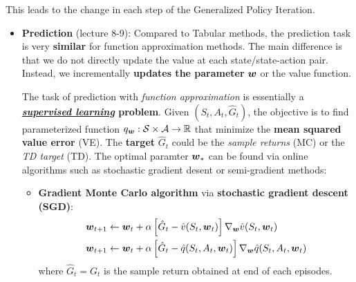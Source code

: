 \documentclass[11pt]{article}
\begin{document}
This leads to the change in each step of the Generalized Policy Iteration.
\begin{itemize}
\item \textbf{Prediction} (lecture 8-9): Compared to Tabular methods, the prediction task is very \textbf{similar} for function approximation methods. The main difference is that we do not directly update the value at each state/state-action pair. Instead, we incrementally \textbf{updates the parameter} $\boldsymbol{w}$ or the value function. 

The task of prediction with \emph{function approximation} is essentially a \textbf{\emph{\underline{supervised learning}} problem}. Given $(S_{t}, A_{t}, \hat{G}_{t})$, the objective is to find parameterized function $q_{\boldsymbol{w}}: {\mathcal S} \times {\mathcal A} \rightarrow {\mathbb R}$ that minimize the \textbf{mean squared value error} (VE). The \textbf{target} $\hat{G}_{t}$ could be the \emph{sample returns} (MC) or the \emph{TD target} (TD). The optimal paramter $\boldsymbol{w}_{*}$ can be found via online algorithms such as stochastic gradient desent or semi-gradient methods:
\begin{itemize}
\item \textbf{Gradient Monte Carlo algorithm} via \textbf{stochastic gradient descent (SGD)}: 
\begin{align}
\boldsymbol{w}_{t+1} &\leftarrow  \boldsymbol{w}_{t} + \alpha \left[\hat{G}_{t} - \hat{v}(S_{t}, \boldsymbol{w}_{t})\right] \nabla_{\boldsymbol{w}}{\hat{v}(S_{t}, \boldsymbol{w}_{t})} \label{eqn: sgd_fun_approx} \\
\boldsymbol{w}_{t+1} &\leftarrow  \boldsymbol{w}_{t} + \alpha \left[\hat{G}_{t} - \hat{q}(S_{t}, A_{t}, \boldsymbol{w}_{t})\right] \nabla_{\boldsymbol{w}}{\hat{q}(S_{t},  A_{t}, \boldsymbol{w}_{t})} \nonumber
\end{align} where $\hat{G}_{t} = G_{t}$ is the sample return obtained at end of each episodes. 


\end{itemize}
\end{itemize}
\end{document}
